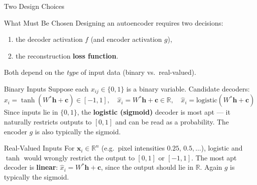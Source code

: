 \documentclass{beamer}
\begin{document}
\begin{frame}[shrink=10]{Two Design Choices}
  \begin{block}{What Must Be Chosen}
    Designing an autoencoder requires two decisions:
    \begin{enumerate}\setlength\itemsep{4pt}
      \item the decoder activation $f$ (and encoder activation $g$),
      \item the reconstruction \textbf{loss function}.
    \end{enumerate}
    Both depend on the \emph{type} of input data (binary vs.\ real-valued).
  \end{block}

  \begin{block}{Binary Inputs}
    Suppose each $x_{ij} \in \{0,1\}$ is a binary variable.
    Candidate decoders:
    \[
      \hat{x}_i = \tanh(W^{*}\mathbf{h}+\mathbf{c}) \in [-1,1],\quad
      \hat{x}_i = W^{*}\mathbf{h}+\mathbf{c} \in \mathbb{R},\quad
      \hat{x}_i = \text{logistic}(W^{*}\mathbf{h}+\mathbf{c})
    \]
    Since inputs lie in $\{0,1\}$, the \textbf{logistic (sigmoid)} decoder
    is most apt --- it naturally restricts outputs to $[0,1]$ and can be
    read as a probability. The encoder $g$ is also typically the sigmoid.
  \end{block}

  \begin{exampleblock}{Real-Valued Inputs}
    For $\mathbf{x}_i \in \mathbb{R}^n$ (e.g.\ pixel intensities
    $0.25,\,0.5,\ldots$), logistic and $\tanh$ would wrongly restrict the
    output to $[0,1]$ or $[-1,1]$. The most apt decoder is
    \textbf{linear}: $\hat{x}_i = W^{*}\mathbf{h}+\mathbf{c}$, since the
    output should lie in $\mathbb{R}$. Again $g$ is typically the sigmoid.
  \end{exampleblock}
\end{frame}
\end{document}
